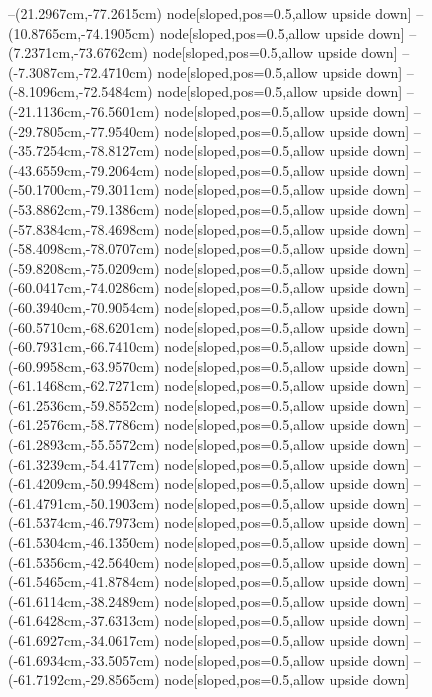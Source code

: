 --(21.2967cm,-77.2615cm) node[sloped,pos=0.5,allow upside down]{\ArrowIn}
--(10.8765cm,-74.1905cm) node[sloped,pos=0.5,allow upside down]{\ArrowIn}
--(7.2371cm,-73.6762cm) node[sloped,pos=0.5,allow upside down]{\ArrowIn}
--(-7.3087cm,-72.4710cm) node[sloped,pos=0.5,allow upside down]{\ArrowIn}
--(-8.1096cm,-72.5484cm) node[sloped,pos=0.5,allow upside down]{\arrowIn}
--(-21.1136cm,-76.5601cm) node[sloped,pos=0.5,allow upside down]{\ArrowIn}
--(-29.7805cm,-77.9540cm) node[sloped,pos=0.5,allow upside down]{\ArrowIn}
--(-35.7254cm,-78.8127cm) node[sloped,pos=0.5,allow upside down]{\ArrowIn}
--(-43.6559cm,-79.2064cm) node[sloped,pos=0.5,allow upside down]{\ArrowIn}
--(-50.1700cm,-79.3011cm) node[sloped,pos=0.5,allow upside down]{\ArrowIn}
--(-53.8862cm,-79.1386cm) node[sloped,pos=0.5,allow upside down]{\ArrowIn}
--(-57.8384cm,-78.4698cm) node[sloped,pos=0.5,allow upside down]{\ArrowIn}
--(-58.4098cm,-78.0707cm) node[sloped,pos=0.5,allow upside down]{\arrowIn}
--(-59.8208cm,-75.0209cm) node[sloped,pos=0.5,allow upside down]{\ArrowIn}
--(-60.0417cm,-74.0286cm) node[sloped,pos=0.5,allow upside down]{\ArrowIn}
--(-60.3940cm,-70.9054cm) node[sloped,pos=0.5,allow upside down]{\ArrowIn}
--(-60.5710cm,-68.6201cm) node[sloped,pos=0.5,allow upside down]{\ArrowIn}
--(-60.7931cm,-66.7410cm) node[sloped,pos=0.5,allow upside down]{\ArrowIn}
--(-60.9958cm,-63.9570cm) node[sloped,pos=0.5,allow upside down]{\ArrowIn}
--(-61.1468cm,-62.7271cm) node[sloped,pos=0.5,allow upside down]{\ArrowIn}
--(-61.2536cm,-59.8552cm) node[sloped,pos=0.5,allow upside down]{\ArrowIn}
--(-61.2576cm,-58.7786cm) node[sloped,pos=0.5,allow upside down]{\ArrowIn}
--(-61.2893cm,-55.5572cm) node[sloped,pos=0.5,allow upside down]{\ArrowIn}
--(-61.3239cm,-54.4177cm) node[sloped,pos=0.5,allow upside down]{\ArrowIn}
--(-61.4209cm,-50.9948cm) node[sloped,pos=0.5,allow upside down]{\ArrowIn}
--(-61.4791cm,-50.1903cm) node[sloped,pos=0.5,allow upside down]{\arrowIn}
--(-61.5374cm,-46.7973cm) node[sloped,pos=0.5,allow upside down]{\ArrowIn}
--(-61.5304cm,-46.1350cm) node[sloped,pos=0.5,allow upside down]{\arrowIn}
--(-61.5356cm,-42.5640cm) node[sloped,pos=0.5,allow upside down]{\ArrowIn}
--(-61.5465cm,-41.8784cm) node[sloped,pos=0.5,allow upside down]{\arrowIn}
--(-61.6114cm,-38.2489cm) node[sloped,pos=0.5,allow upside down]{\ArrowIn}
--(-61.6428cm,-37.6313cm) node[sloped,pos=0.5,allow upside down]{\arrowIn}
--(-61.6927cm,-34.0617cm) node[sloped,pos=0.5,allow upside down]{\ArrowIn}
--(-61.6934cm,-33.5057cm) node[sloped,pos=0.5,allow upside down]{\arrowIn}
--(-61.7192cm,-29.8565cm) node[sloped,pos=0.5,allow upside down]{\ArrowIn}
